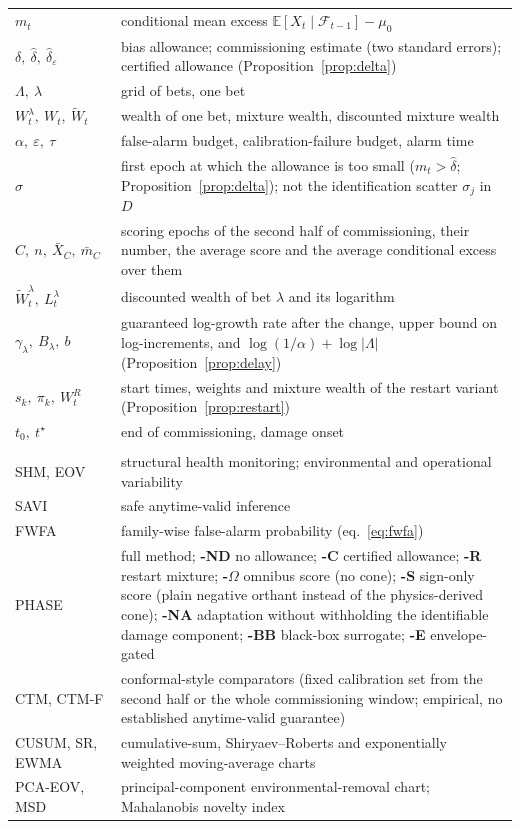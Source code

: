 \documentclass[12pt,a4paper]{article}
\newenvironment{revblock}{}{}
\newenvironment{revblock}{\begingroup\color{revcol}}{\endgroup}
\newcommand{\rtwo}[1]{#1}
\newcommand{\rtwo}[1]{{\color{revcolb}#1}}
\newcommand{\E}{\mathbb{E}}
\newcommand{\F}{\mathcal{F}}
\begin{document}
\begin{revblock}
\begin{singlespace}
\begin{tabular}{@{}p{3.1cm}p{12.2cm}@{}}
$m_t$ & conditional mean excess $\E[X_t\mid\F_{t-1}]-\mu_0$\\
$\delta,\ \hat\delta,\ \hat\delta_\varepsilon$ & bias allowance; commissioning estimate (two standard errors); certified allowance (Proposition~\ref{prop:delta})\\
$\Lambda,\ \lambda$ & grid of bets, one bet\\
$W_t^\lambda,\ W_t,\ \widetilde W_t$ & wealth of one bet, mixture wealth, discounted mixture wealth\\
$\alpha,\ \varepsilon,\ \tau$ & false-alarm budget, calibration-failure budget, alarm time\\
$\sigma$ & first epoch at which the allowance is too small ($m_t>\hat\delta$; Proposition~\ref{prop:delta}); not the identification scatter $\sigma_j$ in $D$\\
$C,\ n,\ \bar X_C,\ \bar m_C$ & scoring epochs of the second half of commissioning, their number, the average score and the average conditional excess over them\\
$\widetilde W^\lambda_t,\ L^\lambda_t$ & discounted wealth of bet $\lambda$ and its logarithm\\
$\gamma_\lambda,\ B_\lambda,\ b$ & guaranteed log-growth rate after the change, upper bound on log-increments, and $\log(1/\alpha)+\log|\Lambda|$ (Proposition~\ref{prop:delay})\\
$s_k,\ \pi_k,\ W^R_t$ & start times, weights and mixture wealth of the restart variant (Proposition~\ref{prop:restart})\\
$t_0,\ t^\star$ & end of commissioning, damage onset\\
\addlinespace
\multicolumn{2}{@{}l}{\textit{Acronyms and variant labels}}\\
SHM, EOV & structural health monitoring; environmental and operational variability\\
SAVI & safe anytime-valid inference\\
FWFA & family-wise false-alarm probability (eq.~\ref{eq:fwfa})\\
PHASE & full method; \textbf{-ND} no allowance; \textbf{-C} certified allowance; \textbf{-R} restart mixture; \textbf{-$\Omega$} omnibus score (no cone); \textbf{-S} sign-only score (plain negative orthant instead of the physics-derived cone); \textbf{-NA} adaptation without withholding the identifiable damage component; \textbf{-BB} black-box surrogate; \textbf{-E} envelope-gated\\
CTM, CTM-F & \rtwo{conformal-style comparators (fixed calibration set from the second half or the whole commissioning window; empirical, no established anytime-valid guarantee)}  \\
CUSUM, SR, EWMA & cumulative-sum, Shiryaev--Roberts and exponentially weighted moving-average charts\\
PCA-EOV, MSD & principal-component environmental-removal chart; Mahalanobis novelty index\\
\bottomrule
\end{tabular}
\end{singlespace}


\end{revblock}
\end{document}
